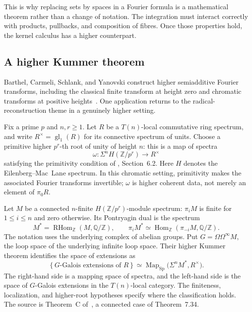 \documentclass[11pt]{article}
\theoremstyle{remark}
\begin{document}
This is why replacing sets by spaces in a Fourier formula is a mathematical theorem rather than a change of notation. The integration must interact correctly with products, pullbacks, and composition of fibres. Once those properties hold, the kernel calculus has a higher counterpart.

\subsection{A higher Kummer theorem}

Barthel, Carmeli, Schlank, and Yanovski construct higher semiadditive Fourier transforms, including the classical finite transform at height zero and chromatic transforms at positive heights~\cite{chromatic}. One application returns to the radical-reconstruction theme in a genuinely higher setting.

Fix a prime \(p\) and \(n,r\geq1\). Let \(R\) be a \(T(n)\)-local commutative ring spectrum, and write \(R^\times=\operatorname{gl}_1(R)\) for its connective spectrum of units. Choose a primitive higher \(p^r\)-th root of unity of height \(n\): this is a map of spectra
\[
\omega:\Sigma^n H(\mathbb Z/p^r)\longrightarrow R^\times
\]
satisfying the primitivity condition of \cite{chromatic}, Section~6.2. Here \(H\) denotes the Eilenberg--Mac~Lane spectrum. In this chromatic setting, primitivity makes the associated Fourier transforms invertible; \(\omega\) is higher coherent data, not merely an element of \(\pi_0R\).

Let \(M\) be a connected \(n\)-finite \(H(\mathbb Z/p^r)\)-module spectrum: \(\pi_iM\) is finite for \(1\leq i\leq n\) and zero otherwise. Its Pontryagin dual is the spectrum
\[
M^*=\operatorname{RHom}_{\mathbb Z}(M,\mathbb Q/\mathbb Z),
\qquad
\pi_iM^*\simeq\operatorname{Hom}_{\mathbb Z}(\pi_{-i}M,\mathbb Q/\mathbb Z).
\]
The notation uses the underlying complex of abelian groups. Put \(G=\Omega\Omega^\infty M\), the loop space of the underlying infinite loop space. Their higher Kummer theorem identifies the space of extensions as
\begin{equation}
\left\{G\text{-Galois extensions of }R\right\}
\simeq
\operatorname{Map}_{\mathrm{Sp}}\bigl(\Sigma^n M^*,R^\times\bigr).
\label{higher:kummer}
\end{equation}
The right-hand side is a mapping space of spectra, and the left-hand side is the space of \(G\)-Galois extensions in the \(T(n)\)-local category. The finiteness, localization, and higher-root hypotheses specify where the classification holds. The source is Theorem~C of~\cite{chromatic}, a connected case of Theorem~7.34.
\end{document}
